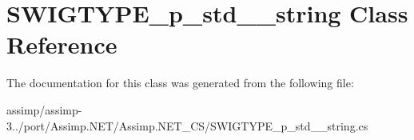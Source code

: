 \hypertarget{class_s_w_i_g_t_y_p_e__p__std____string}{\section{S\+W\+I\+G\+T\+Y\+P\+E\+\_\+p\+\_\+std\+\_\+\+\_\+string Class Reference}
\label{class_s_w_i_g_t_y_p_e__p__std____string}
}


The documentation for this class was generated from the following file\+:\begin{DoxyCompactItemize}
\item 
assimp/assimp-\/3../port/\+Assimp.\+N\+E\+T/\+Assimp.\+N\+E\+T\+\_\+\+C\+S/S\+W\+I\+G\+T\+Y\+P\+E\+\_\+p\+\_\+std\+\_\+\+\_\+string.\+cs\end{DoxyCompactItemize}
